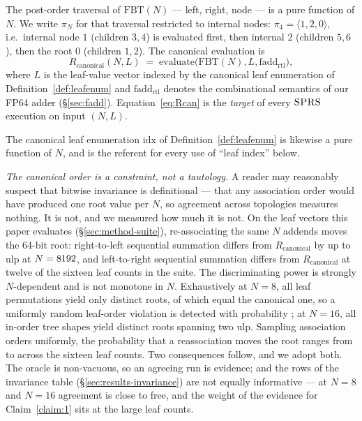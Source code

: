 \documentclass[journal,10pt]{IEEEtran}
\theoremstyle{plain}
\theoremstyle{definition}
\theoremstyle{remark}
\newcommand{\FBT}{\ensuremath{\mathrm{FBT}}}
\newcommand{\fadd}{\ensuremath{\mathrm{fadd}_{\mathrm{rtl}}}}
\newcommand{\Rcan}{\ensuremath{R_{\mathrm{canonical}}}}
\newcommand{\sprs}{\textsc{SPRS}}
\renewcommand{\OrderLRDiff}{twelve}
\begin{document}
The post-order traversal of $\FBT(N)$ --- left, right, node --- is a pure
function of $N$. We write $\pi_N$ for that traversal restricted to
internal nodes: $\pi_4 = \langle 1,2,0\rangle$, i.e.\ internal node $1$
(children $3,4$) is evaluated first, then internal $2$ (children $5,6$),
then the root $0$ (children $1,2$). The canonical evaluation is
\begin{equation}\label{eq:Rcan}
  \Rcan(N, L) \;=\; \mathrm{evaluate}\bigl(\FBT(N), L, \fadd\bigr),
\end{equation}
where $L$ is the leaf-value vector indexed by the canonical leaf
enumeration of Definition~\ref{def:leafenum}
and $\fadd$ denotes the combinational semantics of our FP64 adder
(\S\ref{sec:fadd}). Equation~\eqref{eq:Rcan} is the \emph{target} of every
$\sprs{}$ execution on input $(N, L)$.

The canonical leaf enumeration $\mathrm{idx}$ of
Definition~\ref{def:leafenum} is likewise a pure function of $N$, and is the
referent for every use of ``leaf index'' below.

\emph{The canonical order is a constraint, not a tautology.} A reader may
reasonably suspect that bitwise invariance is definitional --- that any
association order would have produced one root value per $N$, so agreement
across topologies measures nothing. It is not, and we measured how much it
is not. On the leaf vectors this paper evaluates
(\S\ref{sec:method-suite}), re-associating the same $N$ addends moves the
64-bit root: right-to-left sequential summation differs from $\Rcan$ by up
to \OrderUlpMax{} ulp at $N = 8192$, and left-to-right sequential
summation differs from $\Rcan$ at \OrderLRDiff{} of the sixteen leaf counts
in the suite. The discriminating power is strongly $N$-dependent and is not
monotone in $N$. Exhaustively at $N=8$, all \OrderPermsEight{} leaf
permutations yield only \OrderRootsEight{} distinct roots, of which
\OrderCanonPctEight{} equal the canonical one, so a uniformly random
leaf-order violation is detected with probability \OrderDetectEight{}; at
$N=16$, all \OrderShapesSixteen{} in-order tree shapes yield
\OrderRootsSixteen{} distinct roots spanning two ulp. Sampling association
orders uniformly, the probability that a reassociation moves the root
ranges from \OrderProbMin{} to \OrderProbMax{} across the sixteen leaf
counts. Two consequences follow, and we adopt both. The oracle is
non-vacuous, so an agreeing run is evidence; and the rows of the invariance
table (\S\ref{sec:results-invariance}) are not equally informative --- at
$N=8$ and $N=16$ agreement is close to free, and the weight of the evidence
for Claim~\ref{claim:1} sits at the large leaf counts.
\end{document}
